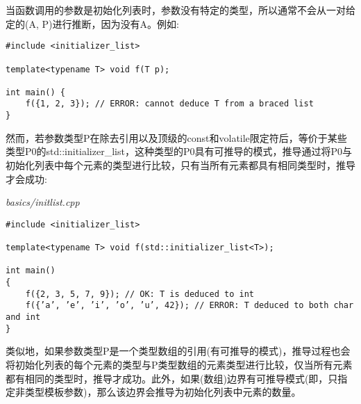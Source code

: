 当函数调用的参数是初始化列表时，参数没有特定的类型，所以通常不会从一对给定的(A, P)进行推断，因为没有A。例如:

\begin{lstlisting}[style=styleCXX]
#include <initializer_list>

template<typename T> void f(T p);

int main() {
	f({1, 2, 3}); // ERROR: cannot deduce T from a braced list
}
\end{lstlisting}

然而，若参数类型P在除去引用以及顶级的const和volatile限定符后，等价于某些类型P0的std::initializer\_list，这种类型的P0具有可推导的模式，推导通过将P0与初始化列表中每个元素的类型进行比较，只有当所有元素都具有相同类型时，推导才会成功:

\noindent
\textit{basics/initlist.cpp}
\begin{lstlisting}[style=styleCXX]
#include <initializer_list>

template<typename T> void f(std::initializer_list<T>);

int main()
{
	f({2, 3, 5, 7, 9}); // OK: T is deduced to int
	f({’a’, ’e’, ’i’, ’o’, ’u’, 42}); // ERROR: T deduced to both char and int
}
\end{lstlisting}

类似地，如果参数类型P是一个类型数组的引用(有可推导的模式)，推导过程也会将初始化列表的每个元素的类型与P类型数组的元素类型进行比较，仅当所有元素都有相同的类型时，推导才成功。此外，如果(数组)边界有可推导模式(即，只指定非类型模板参数)，那么该边界会推导为初始化列表中元素的数量。












































